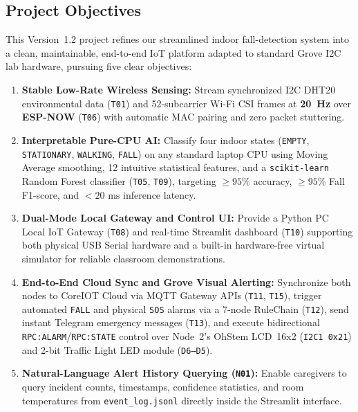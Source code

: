 \documentclass{hcmut-report}
\begin{document}
\subsection{Project Objectives}
This Version~1.2 project refines our streamlined indoor fall-detection system into a clean, maintainable, end-to-end IoT platform adapted to standard Grove I2C lab hardware, pursuing five clear objectives:
\begin{enumerate}
  \item \textbf{Stable Low-Rate Wireless Sensing:} Stream synchronized I2C DHT20 environmental data (\texttt{T01}) and 52-subcarrier Wi-Fi CSI frames at \textbf{20~Hz} over \textbf{ESP-NOW} (\texttt{T06}) with automatic MAC pairing and zero packet stuttering.
  \item \textbf{Interpretable Pure-CPU AI:} Classify four indoor states (\texttt{EMPTY}, \texttt{STATIONARY}, \texttt{WALKING}, \texttt{FALL}) on any standard laptop CPU using Moving Average smoothing, 12 intuitive statistical features, and a \texttt{scikit-learn} Random Forest classifier (\texttt{T05}, \texttt{T09}), targeting $\geq 95\%$ accuracy, $\geq 95\%$ Fall F1-score, and $< 20\text{ ms}$ inference latency.
  \item \textbf{Dual-Mode Local Gateway and Control UI:} Provide a Python PC Local IoT Gateway (\texttt{T08}) and real-time Streamlit dashboard (\texttt{T10}) supporting both physical USB Serial hardware and a built-in hardware-free virtual simulator for reliable classroom demonstrations.
  \item \textbf{End-to-End Cloud Sync and Grove Visual Alerting:} Synchronize both nodes to CoreIOT Cloud via MQTT Gateway APIs (\texttt{T11}, \texttt{T15}), trigger automated \texttt{FALL} and physical \texttt{SOS} alarms via a 7-node RuleChain (\texttt{T12}), send instant Telegram emergency messages (\texttt{T13}), and execute bidirectional \texttt{RPC:ALARM}/\texttt{RPC:STATE} control over Node~2's OhStem LCD~16x2 (\texttt{I2C1 0x21}) and 2-bit Traffic Light LED module (\texttt{D6--D5}).
  \item \textbf{Natural-Language Alert History Querying (\texttt{N01}):} Enable caregivers to query incident counts, timestamps, confidence statistics, and room temperatures from \texttt{event\_log.jsonl} directly inside the Streamlit interface.
\end{enumerate}
\end{document}
